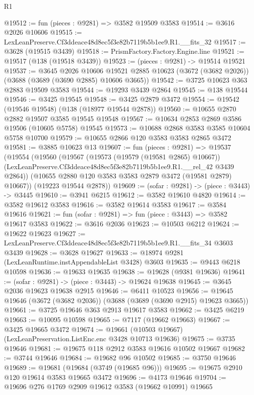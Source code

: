 \begin{lexlean}{R1}
\begin{coremodule}
@19512 := fun (pieces : @9281) => @3582 @19509 @3583
@19514 := @3616 @2026 @10606
@19515 := LexLeanPreserve.Cf3ddeace48d8ec5f3e82b7119b5b1ee9.R1.__fits_32
@19517 := @3628 (@19515 @3439)
@19518 := PrismFactory.Factory.Engine.line
@19521 := @19517 (@138 (@19518 @3439))
@19523 := (pieces : @9281) -> @19514 @19521
@19537 := @3645
    @2026
    @10606
    @19521
    @2885
    @10623
    (@3672 (@3682 @2026))
    (@3688 (@3689 (@3690 @2885) @10606 @3665))
@19542 := @3725 @10623 @363 @2883 @19509 @3583
@19544 := @19293 @3439 @2864
@19545 := @138 @19544
@19546 := @3425 @19545
@19548 := @3425 @2879 @3472
@19554 := @19542 (@19546 @19548) (@138 (@18977 @19544 @2878))
@19560 := @10655 @2870 @2882 @19507 @3585 @19545 @19548
@19567 := @10634 @2853 @2869 @3586 @19506 (@10605 @5758) @19545
@19573 := @10688 @2868 @3583 @3585 @10604 @5758 @10700
@19579 := @10655 @2866 @120 @3583 @3583 @2865 @3472
@19581 := @3885 @10623 @13
@19607 := fun (pieces : @9281) =>
  @19537
    (@19554
      (@19560
        (@19567
          (@19573 (@19579 (@19581 @2865) @10667))
          (LexLeanPreserve.Cf3ddeace48d8ec5f3e82b7119b5b1ee9.R1.__rel_42 @3439 @2864))
        (@10655 @2880 @120 @3583 @3583 @2879 @3472 (@19581 @2879) @10667))
      (@19223 @19544 @2878))
@19609 := (sofar : @9281) -> (piece : @3443) -> @3445
@19610 := @3941 @6215
@19612 := @3582 @19610 @4820
@19614 := @3582 @19612 @3583
@19616 := @3582 @19614 @3583
@19617 := @3584 @19616
@19621 := fun (sofar : @9281) => fun (piece : @3443) => @3582 @19617 @3583
@19622 := @3616 @2036
@19623 := @10503 @6212
@19624 := @19622 @19623
@19627 := LexLeanPreserve.Cf3ddeace48d8ec5f3e82b7119b5b1ee9.R1.__fits_34 @3603 @3439
@19628 := @3628 @19627
@19633 := @18974 @9281 (LexLeanRuntime.instAppendableList @3428) @3603
@19635 := @9443 @6218 @10598
@19636 := @19633 @19635
@19638 := @19628 (@9381 @19636)
@19641 := (sofar : @9281) -> (piece : @3443) -> @19624 @19638
@19645 := @3645 @2036 @19623 @19638 @2915
@19646 := @6411 @10523
@19656 := @19645 @19646 (@3672 (@3682 @2036)) (@3688 (@3689 (@3690 @2915) @19623 @3665))
@19661 := @3725 @19646 @363 @2913 @19617 @3583
@19662 := @3425 @6219
@19663 := @10095 @10598
@19665 := @7117 (@19662 @19663)
@19667 := @3425 @19665 @3472
@19674 := @19661 (@10503 @19667) (LexLeanPreservation.ListEnc.enc @3428 @10713 @19636)
@19675 := @3735 @19646
@19681 := @19675 @118 @2912 @3583 @19616 @10502 @19667
@19682 := @3744 @19646
@19684 := @19682 @96 @10502
@19685 := @3750 @19646
@19689 := @19681 (@19684 (@3749 (@19685 @96)))
@19695 := @19675 @2910 @120 @19614 @3583 @19665 @3472
@19696 := @4173 @19646
@19704 := @19696 @276 @1769 @2909 @19612 @3583 (@19662 @10991) @19665

\end{coremodule}
\end{lexlean}
